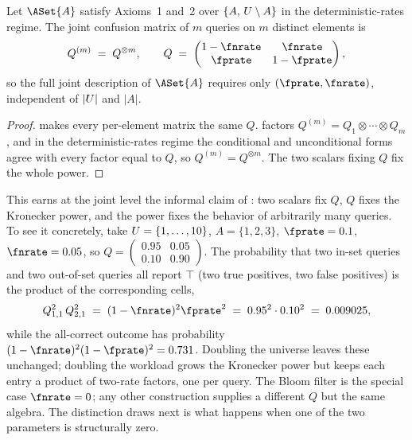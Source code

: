 \begin{corollary}
\label{cor:kronecker-set}
Let $\ASet{A}$ satisfy Axioms~1 and~2 over $\{A,\, U \setminus A\}$
in the deterministic-rates regime. The joint confusion matrix of $m$
queries on $m$ distinct elements is
\[
  Q^{(m)} \;=\; Q^{\otimes m},
  \qquad
  Q \;=\;
  \begin{pmatrix}
    1 - \fnrate & \fnrate \\
    \fprate & 1 - \fprate
  \end{pmatrix},
\]
so the full joint description of $\ASet{A}$ requires only
$(\fprate, \fnrate)$, independent of $|U|$ and $|A|$.
\end{corollary}

\begin{proof}
 makes every per-element matrix the same $Q$.
 factors $Q^{(m)} = Q_1 \otimes \cdots \otimes Q_m$,
and in the deterministic-rates regime the conditional and unconditional
forms agree with every factor equal to $Q$, so $Q^{(m)} = Q^{\otimes m}$.
The two scalars fixing $Q$ fix the whole power.
\end{proof}

This earns at the joint level the informal claim of
: two scalars fix $Q$, $Q$ fixes the Kronecker
power, and the power fixes the behavior of arbitrarily many queries. To see
it concretely, take $U = \{1, \ldots, 10\}$, $A = \{1, 2, 3\}$,
$\fprate = 0.1$, $\fnrate = 0.05$, so $Q = \left(\begin{smallmatrix} 0.95 &
0.05 \\ 0.10 & 0.90 \end{smallmatrix}\right)$. The probability that two
in-set queries and two out-of-set queries all report $\top$ (two true
positives, two false positives) is the product of the corresponding cells,
\[
  Q_{1,1}^2\, Q_{2,1}^2 \;=\; (1 - \fnrate)^2 \fprate^2
  \;=\; 0.95^2 \cdot 0.10^2 \;=\; 0.009025,
\]
while the all-correct outcome has probability $(1-\fnrate)^2(1-\fprate)^2 =
0.731$. Doubling the universe leaves these unchanged; doubling the workload
grows the Kronecker power but keeps each entry a product of two-rate
factors, one per query. The Bloom filter is the special case $\fnrate = 0$;
any other construction supplies a different $Q$ but the same algebra. The
distinction  draws next is what happens when
one of the two parameters is structurally zero.
